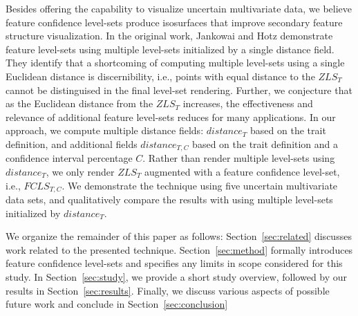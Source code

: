 Besides offering the capability to visualize uncertain multivariate data, we believe feature confidence level-sets 
produce isosurfaces that improve secondary feature structure visualization.
%
In the original work, Jankowai and Hotz demonstrate feature level-sets using multiple level-sets initialized by a single distance field.
%
They identify that a shortcoming of computing multiple level-sets using a single Euclidean distance is discernibility, i.e., points with equal distance to the $ZLS_{T}$ cannot be distinguised in the final level-set rendering.
%
Further, we conjecture that as the Euclidean distance from the $ZLS_{T}$ increases, the effectiveness and relevance of additional feature level-sets reduces for many applications.
%
In our approach, we compute multiple distance fields: $distance_{T}$ based on the trait definition, and additional fields $distance_{T,C}$ based on the trait definition and a confidence interval percentage $C$. 
%
Rather than render multiple level-sets using $distance_{T}$, we only render $ZLS_{T}$ augmented with a feature confidence level-set, i.e., $FCLS_{T,C}$.
%
We demonstrate the technique using five uncertain multivariate data sets, and qualitatively compare the results with using multiple level-sets initialized by $distance_{T}$.

We organize the remainder of this paper as follows:
Section~\ref{sec:related} discusses work related to the presented technique. 
Section~\ref{sec:method} formally introduces feature confidence level-sets and specifies any limits in scope considered for this study.
In Section~\ref{sec:study}, we provide a short study overview, followed by our results in Section~\ref{sec:results}.
Finally, we discuss various aspects of possible future work and conclude in Section~\ref{sec:conclusion}

